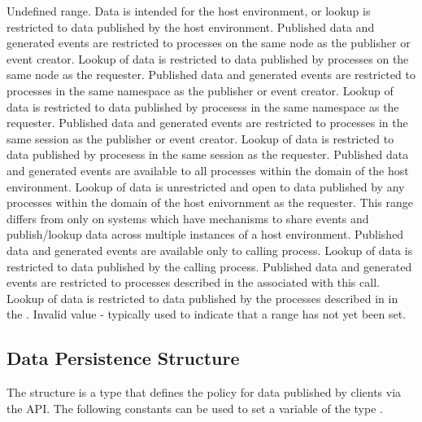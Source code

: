 \begin{constantdesc}
%
Undefined range.
%
Data is intended for the host environment, or lookup is restricted to 
data published by the host environment.
%
Published data and generated events are restricted to processes on the same node as the publisher or event creator.  Lookup of data is restricted to data published by processes on the same node as the requester.
%
Published data and generated events are restricted to processes in the same namespace as the publisher or event creator.
Lookup of data is restricted to data published by procesess in the same namespace as the requester.
%
Published data and generated events are restricted to processes in the same session as the publisher or event creator.
Lookup of data is restricted to data published by procesess in the same session as the requester.
%
Published data and generated events are available to all processes within the domain of the host environment.
Lookup of data is unrestricted and open to data published by any processes within the domain of the host enivornment as the requester.  This range differs from  only on systems which have mechanisms to share events and
publish/lookup data across multiple instances of a host environment.
%
Published data and generated events are available only to calling process.
Lookup of data is restricted to data published by the calling process.
%
Published data and generated events are restricted to processes
described in the  associated with this call.
Lookup of data is restricted to data published by the processes described in
in the .
%
Invalid value - typically used to indicate that a range has not yet been set.
%
\end{constantdesc}


\subsection{Data Persistence Structure}

The  structure is a  type that defines the policy for data published by clients via the  \ac{API}.
The following constants can be used to set a variable of the type .

